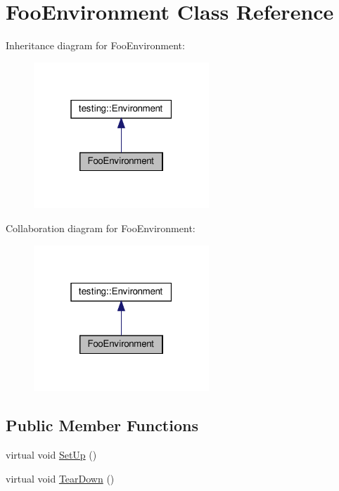 \hypertarget{class_foo_environment}{}\section{Foo\+Environment Class Reference}
\label{class_foo_environment}


Inheritance diagram for Foo\+Environment\+:
\nopagebreak
\begin{figure}[H]
\begin{center}
\leavevmode
\includegraphics[width=187pt]{class_foo_environment__inherit__graph}
\end{center}
\end{figure}


Collaboration diagram for Foo\+Environment\+:
\nopagebreak
\begin{figure}[H]
\begin{center}
\leavevmode
\includegraphics[width=187pt]{class_foo_environment__coll__graph}
\end{center}
\end{figure}
\subsection*{Public Member Functions}
\begin{DoxyCompactItemize}
\item 
virtual void \hyperlink{class_foo_environment_a7db8d8b312805aff437ae8534132a56d}{Set\+Up} ()
\item 
virtual void \hyperlink{class_foo_environment_a99a2c9df52106cce9e7a4bdda53df802}{Tear\+Down} ()
\end{DoxyCompactItemize}


